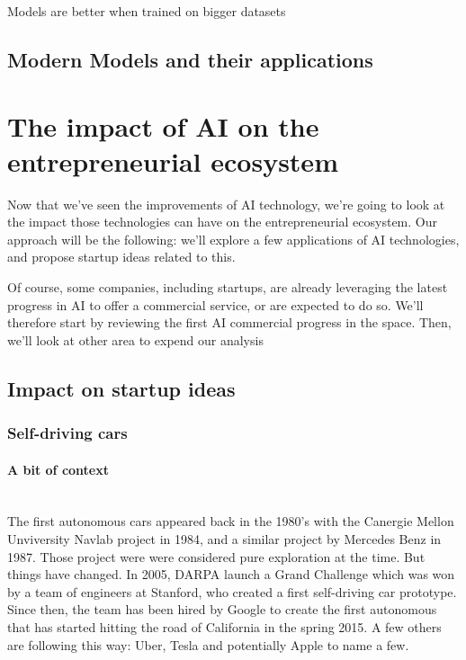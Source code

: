 \documentclass[12pt]{article}
\begin{document}
Models are better when trained on bigger datasets

\subsection{Modern Models and their applications}
\pagebreak



\section{The impact of AI on the entrepreneurial ecosystem}

Now that we've seen the improvements of AI technology, we're going to look at
the impact those technologies can have on the entrepreneurial ecosystem.
Our approach will be the following: we'll explore a few applications of AI
technologies, and propose startup ideas related to this.

Of course, some companies, including startups, are already leveraging the latest
 progress in AI to offer a commercial service, or are expected to do so.
 We'll therefore start by reviewing the first AI commercial progress in the
 space. Then, we'll look at other area to expend our analysis

\subsection{Impact on startup ideas}

\subsubsection{Self-driving cars}

\paragraph{A bit of context}
\\

The first autonomous cars appeared back in the 1980's with the Canergie Mellon
Unviversity Navlab project in 1984, and a similar project by Mercedes Benz in
1987. Those project were were considered pure exploration at the time.
But things have changed. In 2005, DARPA launch a Grand Challenge which was won
by a team of engineers at Stanford, who created a first self-driving car
prototype. Since then, the team has been hired by Google to create the first
autonomous that has started hitting the road of California in the spring 2015.
A few others are following this way: Uber, Tesla and potentially Apple to name
a few.
\end{document}
